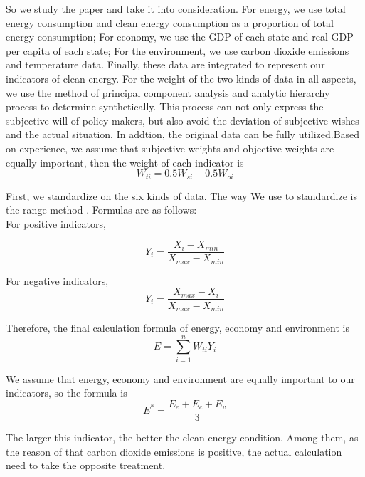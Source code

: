 \documentclass{mcmthesis}
\begin{document}
So we study the paper \cite{zhaotao2008energy} and take it into consideration. For energy, we use total energy consumption and clean energy consumption as a proportion of total energy consumption; For economy, we use the GDP of each state and real GDP per capita of each state; For the environment, we use carbon dioxide emissions and temperature data. Finally, these data are integrated to represent our indicators of clean energy.
For the weight of the two kinds of data in all aspects, we use the method of principal component analysis and analytic hierarchy process to determine synthetically. This process can not only express the subjective will of policy makers, but also avoid the deviation of subjective wishes and the actual situation. In addtion, the original data can be fully utilized.Based on experience, we assume that subjective weights and objective weights are equally important, then the weight of each  indicator is
\begin{equation}
  W_{ti} = 0.5 W_{si} + 0.5 W_{oi} 
\end{equation}

First, we standardize on the six kinds of data. The way We use to standardize is the range-method . Formulas are as follows:\\

For positive indicators,

\begin{equation}
  Y_i = \frac{X_i - X_{min}}{X_{max} - X_{min}}
\end{equation}

For negative indicators,
\begin{equation}
  Y_i = \frac{X_{max} - X_i}{X_{max} - X_{min}}
\end{equation}

Therefore, the final calculation formula of energy, economy and environment is 
\begin{equation}
  E = \sum_{i=1}^{n} W_{ti} Y_{i} 
\end{equation}

We assume that energy, economy and environment are equally important to our indicators, so the formula is
\begin{equation}
  E^{*} = \frac{E_e + E_c + E_v}{3}
\end{equation}

The larger this indicator, the better the clean energy condition. Among them, as the reason of that carbon dioxide emissions is positive, the actual calculation need to take the opposite treatment.
\end{document}
